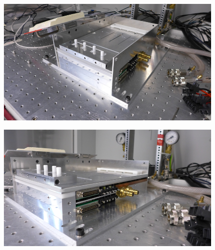 \documentclass[a4paper,12pt,twoside]{article}
\begin{document}
\begin{appendices}
\begin{figure} [h!]
\centering
\begin{minipage}{.48\textwidth}
  \centering
  \includegraphics[width=\textwidth]{./Point5a.png}
  \label{Step5a}
\end{minipage}%
\hspace{2mm}
\begin{minipage}{.48\textwidth}
  \centering
  \includegraphics[width=\textwidth]{./Point5b.png}
  \label{Step5b}
\end{minipage}
\end{figure}


\end{appendices}
\end{document}
